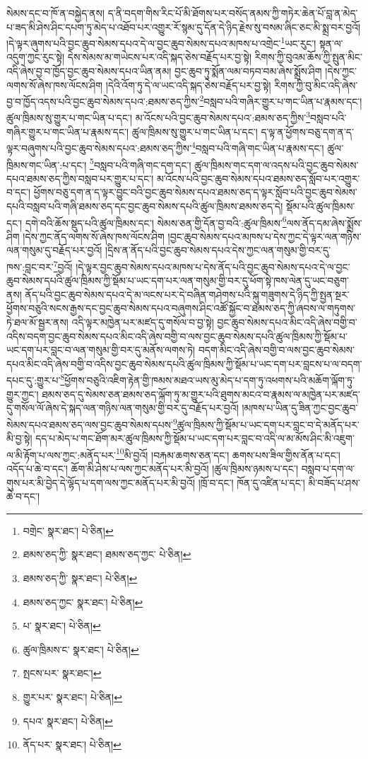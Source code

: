 སེམས་དང་བ་ཁོ་ན་བསྐྱེད་ནས། ད་ནི་བདག་གིས་རིང་པོ་མི་ཐོགས་པར་བསོད་ནམས་ཀྱི་གཏེར་ཆེན་པོ་བླ་ན་མེད་པ་ཟད་མི་ཤེས་ཤིང་དཔག་ཏུ་མེད་པ་འཐོབ་པར་འགྱུར་རོ་སྙམ་དུ་དོན་དེ་ཉིད་རྗེས་སུ་བསམ་ཞིང་ཅང་མི་སྨྲ་བར་བྱའོ། །དེ་ལྟར་ཞུགས་པའི་བྱང་ཆུབ་སེམས་དཔའ་དེ་ལ་བྱང་ཆུབ་སེམས་དཔའ་མཁས་པ་འགྲེང་\footnote{བགྲེང་  སྣར་ཐང་།  པེ་ཅིན། }ཡང་རུང་། སྟན་ལ་འདུག་ཀྱང་རུང་སྟེ། དེས་སེམས་མ་གཡེངས་པར་འདི་སྐད་ཅེས་བརྗོད་པར་བྱ་སྟེ། རིགས་ཀྱི་བུའམ་ཆོས་ཀྱི་སྤུན་མིང་འདི་ཞེས་བྱ་བ་ཁྱོད་བྱང་ཆུབ་སེམས་དཔའ་ཡིན་ནམ། བྱང་ཆུབ་ཏུ་སྨོན་ལམ་བཏབ་བམ་ཞེས་སྨྲོས་ཤིག །དེས་ཀྱང་ལགས་སོ་ཞེས་ཁས་ལོངས་ཤིག །དེའི་འོག་ཏུ་དེ་ལ་ཡང་འདི་སྐད་ཅེས་བརྗོད་པར་བྱ་སྟེ། རིགས་ཀྱི་བུ་མིང་འདི་ཞེས་བྱ་བ་ཁྱོད་འདས་པའི་བྱང་ཆུབ་སེམས་དཔའ་:ཐམས་ཅད་ཀྱིས་\footnote{ཐམས་ཅད་ཀྱི་  སྣར་ཐང་། ཐམས་ཅད་ཀྱང་  པེ་ཅིན། }བསླབ་པའི་གཞིར་གྱུར་པ་གང་ཡིན་པ་རྣམས་དང་། ཚུལ་ཁྲིམས་སུ་གྱུར་པ་གང་ཡིན་པ་དང་། མ་འོངས་པའི་བྱང་ཆུབ་སེམས་དཔའ་:ཐམས་ཅད་ཀྱིས་\footnote{ཐམས་ཅད་ཀྱི་  སྣར་ཐང་།  པེ་ཅིན། }བསླབ་པའི་གཞིར་གྱུར་པ་གང་ཡིན་པ་རྣམས་དང་། ཚུལ་ཁྲིམས་སུ་གྱུར་པ་གང་ཡིན་པ་དང་། ད་ལྟ་ན་ཕྱོགས་བཅུ་དག་ན་ད་ལྟར་བཞུགས་པའི་བྱང་ཆུབ་སེམས་དཔའ་:ཐམས་ཅད་ཀྱིས་\footnote{ཐམས་ཅད་ཀྱང་  སྣར་ཐང་།  པེ་ཅིན། }བསླབ་པའི་གཞི་གང་ཡིན་པ་རྣམས་དང་། ཚུལ་ཁྲིམས་གང་ཡིན་:པ་དང་། \footnote{པ་  སྣར་ཐང་།  པེ་ཅིན། }བསླབ་པའི་གཞི་གང་དག་དང་། ཚུལ་ཁྲིམས་གང་དག་ལ་འདས་པའི་བྱང་ཆུབ་སེམས་དཔའ་ཐམས་ཅད་ཀྱིས་བསླབ་པར་གྱུར་པ་དང་། མ་འོངས་པའི་བྱང་ཆུབ་སེམས་དཔའ་ཐམས་ཅད་སློབ་པར་འགྱུར་བ་དང་། ཕྱོགས་བཅུ་དག་ན་ད་ལྟར་བྱུང་བའི་བྱང་ཆུབ་སེམས་དཔའ་ཐམས་ཅད་ད་ལྟར་སློབ་པའི་བྱང་ཆུབ་སེམས་དཔའི་བསླབ་པའི་གཞི་ཐམས་ཅད་དང་བྱང་ཆུབ་སེམས་དཔའི་ཚུལ་ཁྲིམས་ཐམས་ཅད་དེ། སྡོམ་པའི་ཚུལ་ཁྲིམས་དང་། དགེ་བའི་ཆོས་སྡུད་པའི་ཚུལ་ཁྲིམས་དང་། སེམས་ཅན་གྱི་དོན་བྱ་བའི་:ཚུལ་ཁྲིམས་\footnote{ཚུལ་ཁྲིམས་ང་  སྣར་ཐང་།  པེ་ཅིན། }ལས་ནོད་དམ་ཞེས་སྨྲོས་ཤིག །དེས་ཀྱང་ནོད་ལགས་སོ་ཞེས་ཁས་ལོངས་ཤིག །བྱང་ཆུབ་སེམས་དཔའ་མཁས་པ་དེས་ཀྱང་དེ་ལྟར་ལན་གཉིས་ལན་གསུམ་དུ་བརྗོད་པར་བྱའོ། །དྲིས་ན་ནོད་པའི་བྱང་ཆུབ་སེམས་དཔའ་དེས་ཀྱང་ལན་གསུམ་གྱི་བར་དུ་ཁས་:བླང་བར་\footnote{སྤངས་པར་  སྣར་ཐང་། }བྱའོ། །དེ་ལྟར་བྱང་ཆུབ་སེམས་དཔའ་མཁས་པ་དེས་ནོད་པའི་བྱང་ཆུབ་སེམས་དཔའ་དེ་ལ་བྱང་ཆུབ་སེམས་དཔའི་ཚུལ་ཁྲིམས་ཀྱི་སྡོམ་པ་ཡང་དག་པར་ལན་གསུམ་གྱི་བར་དུ་ཕོག་སྟེ་ཁས་ལེན་དུ་ཡང་བཅུག་ནས། ནོད་པའི་བྱང་ཆུབ་སེམས་དཔའ་དེ་མ་ལངས་པར་དེ་བཞིན་གཤེགས་པའི་སྐུ་གཟུགས་དེ་ཉིད་ཀྱི་སྤྱན་སྔར་ཕྱོགས་བཅུའི་སངས་རྒྱས་དང་བྱང་ཆུབ་སེམས་དཔའ་བཞུགས་ཤིང་འཚོ་སྐྱོང་བ་ཐམས་ཅད་ཀྱི་ཞབས་ལ་གཏུགས་ཏེ་ཐལ་མོ་སྦྱར་ནས། འདི་ལྟར་མཁྱེན་པར་མཛད་དུ་གསོལ་བ་བྱ་སྟེ། བྱང་ཆུབ་སེམས་དཔའ་མིང་འདི་ཞེས་བགྱི་བ་འདིས་བདག་བྱང་ཆུབ་སེམས་དཔའ་མིང་འདི་ཞེས་བགྱི་བ་ལས་བྱང་ཆུབ་སེམས་དཔའི་ཚུལ་ཁྲིམས་ཀྱི་སྡོམ་པ་ཡང་དག་པར་བླང་བ་ལན་གསུམ་གྱི་བར་དུ་མནོས་ལགས་ཏེ། བདག་མིང་འདི་ཞེས་བགྱི་བ་ལས་བྱང་ཆུབ་སེམས་དཔའ་མིང་འདི་ཞེས་བགྱི་བ་འདིས་བྱང་ཆུབ་སེམས་དཔའི་ཚུལ་ཁྲིམས་ཀྱི་སྡོམ་པ་ཡང་དག་པར་བླངས་པ་ལ་བདག་དཔང་དུ་:གྱུར་པ་\footnote{གྱུར་པར་  སྣར་ཐང་།  པེ་ཅིན། }ཕྱོགས་བཅུའི་འཇིག་རྟེན་གྱི་ཁམས་མཐའ་ཡས་མུ་མེད་པ་དག་ཏུ་འཕགས་པའི་མཆོག་ལྐོག་ཏུ་གྱུར་ཀྱང་། ཐམས་ཅད་དུ་སེམས་ཅན་ཐམས་ཅད་ལྐོག་ཏུ་མ་གྱུར་པའི་ཐུགས་མངའ་བ་རྣམས་ལ་མཁྱེན་པར་མཛད་དུ་གསོལ་ལོ་ཞེས་དེ་སྐད་ལན་གཉིས་ལན་གསུམ་གྱི་བར་དུ་བརྗོད་པར་བྱའོ། །མཁས་པ་ཡིན་དུ་ཟིན་ཀྱང་བྱང་ཆུབ་སེམས་དཔའ་ཐམས་ཅད་ལས་བྱང་ཆུབ་སེམས་དཔས་\footnote{དཔའ་  སྣར་ཐང་།  པེ་ཅིན། }ཚུལ་ཁྲིམས་ཀྱི་སྡོམ་པ་ཡང་དག་པར་བླང་བ་དེ་མནོད་པར་མི་བྱ་སྟེ། དད་པ་མེད་པ་གང་ཐོག་མར་ཚུལ་ཁྲིམས་ཀྱི་སྡོམ་པ་ཡང་དག་པར་བླང་བ་འདི་ལ་མ་མོས་ཤིང་མི་འཇུག་ལ་མི་རྟོག་པ་ལས་ཀྱང་:མནོད་པར་\footnote{ནོད་པར་  སྣར་ཐང་།  པེ་ཅིན། }མི་བྱའོ། །བརྐམ་ཆགས་ཅན་དང་། ཆགས་པས་ཟིལ་གྱིས་ནོན་པ་དང་། འདོད་པ་ཆེ་བ་དང་། ཆོག་མི་ཤེས་པ་ལས་ཀྱང་མནོད་པར་མི་བྱའོ། །ཚུལ་ཁྲིམས་ཉམས་པ་དང་། བསླབ་པ་དག་ལ་གུས་པར་མི་བྱེད་དེ་ལྷོད་པ་དག་ལས་ཀྱང་མནོད་པར་མི་བྱའོ། །ཁྲོ་བ་དང་། ཁོན་དུ་འཛིན་པ་དང་། མི་བཟོད་པ་ཤས་ཆེ་བ་དང་། 